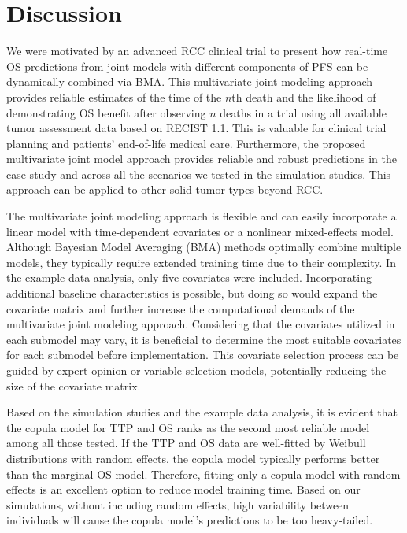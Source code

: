\documentclass[aoas]{imsart}
\theoremstyle{plain}
\theoremstyle{remark}
\begin{document}
\section{Discussion}
\label{sec:discussion}
We were motivated by an advanced RCC clinical trial to present how real-time OS predictions from joint models with different components of PFS can be dynamically combined via BMA. This multivariate joint modeling approach provides reliable estimates of the time of the $n$th death and the likelihood of demonstrating OS benefit after observing $n$ deaths in a trial using all available tumor assessment data based on RECIST 1.1. This is valuable for clinical trial planning and patients' end-of-life medical care. Furthermore, the proposed multivariate joint model approach provides reliable and robust predictions in the case study and across all the scenarios we tested in the simulation studies. This approach can be applied to other solid tumor types beyond RCC.

The multivariate joint modeling approach is flexible and can easily incorporate a linear model with time-dependent covariates or a nonlinear mixed-effects model. Although Bayesian Model Averaging (BMA) methods optimally combine multiple models, they typically require extended training time due to their complexity. In the example data analysis, only five covariates were included. Incorporating additional baseline characteristics is possible, but doing so would expand the covariate matrix and further increase the computational demands of the multivariate joint modeling approach. Considering that the covariates utilized in each submodel may vary, it is beneficial to determine the most suitable covariates for each submodel before implementation. This covariate selection process can be guided by expert opinion or variable selection models, potentially reducing the size of the covariate matrix.

Based on the simulation studies and the example data analysis, it is evident that the copula model for TTP and OS ranks as the second most reliable model among all those tested. If the TTP and OS data are well-fitted by Weibull distributions with random effects, the copula model typically performs better than the marginal OS model. Therefore, fitting only a copula model with random effects is an excellent option to reduce model training time. Based on our simulations, without including random effects, high variability between individuals will cause the copula model's predictions to be too heavy-tailed.
\end{document}
